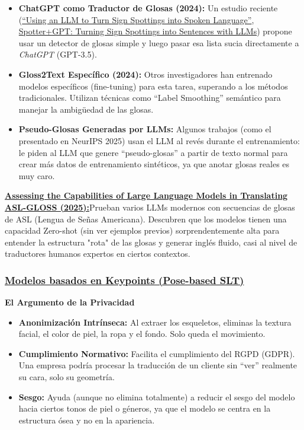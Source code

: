 \documentclass[11pt,a4paper]{article}
\begin{document}
\begin{itemize}
	\item \textbf{ChatGPT como Traductor de Glosas (2024): }Un estudio reciente (\href{https://arxiv.org/abs/2403.10434v1}{``Using an LLM to Turn Sign Spottings into Spoken Language''}, \href{https://arxiv.org/abs/2403.10434}{Spotter+GPT: Turning Sign Spottings into Sentences with LLMs}) propone usar un detector de glosas simple y luego pasar esa lista sucia directamente a \emph{ChatGPT} (GPT-3.5).
	\item \textbf{Gloss2Text Específico (2024):} Otros investigadores han entrenado modelos específicos (fine-tuning) para esta tarea, superando a los métodos tradicionales. Utilizan técnicas como ``Label Smoothing'' semántico para manejar la ambigüedad de las glosas.
	\item \textbf{Pseudo-Glosas Generadas por LLMs:} Algunos trabajos (como el presentado en NeurIPS 2025) usan el LLM al revés durante el entrenamiento: le piden al LLM que genere ``pseudo-glosas'' a partir de texto normal para crear más datos de entrenamiento sintéticos, ya que anotar glosas reales es muy caro.
\end {itemize}

\href{https://personales.upv.es/thinkmind/dl/conferences/gptmb/gptmb_2025/gptmb_2025_1_30_30021.pdf}{\textbf{Assessing the Capabilities of Large Language Models in Translating ASL-GLOSS (2025):}}Prueban varios LLMs modernos con secuencias de glosas de ASL (Lengua de Señas Americana). Descubren que los modelos tienen una capacidad Zero-shot (sin ver ejemplos previos) sorprendentemente alta para entender la estructura "rota" de las glosas y generar inglés fluido, casi al nivel de traductores humanos expertos en ciertos contextos.


\subsubsection{\underline{Modelos basados en Keypoints (Pose-based SLT)}}
\textbf{El Argumento de la Privacidad}
\begin{itemize}
	\item \textbf{Anonimización Intrínseca:} Al extraer los esqueletos, eliminas la textura facial, el color de piel, la ropa y el fondo. Solo queda el movimiento.
	\item \textbf{Cumplimiento Normativo:} Facilita el cumplimiento del RGPD (GDPR). Una empresa podría procesar la traducción de un cliente sin ``ver'' realmente su cara, solo su geometría.
	\item \textbf{Sesgo:} Ayuda (aunque no elimina totalmente) a reducir el sesgo del modelo hacia ciertos tonos de piel o géneros, ya que el modelo se centra en la estructura ósea y no en la apariencia.
\end{itemize}
\end{document}
